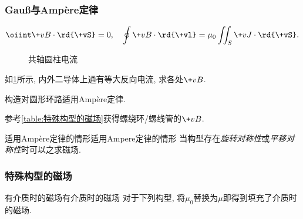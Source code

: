 \documentclass[hidelinks]{ctexart}
\begin{document}

\subsubsection{\texorpdfstring{Gau\ss 与Amp\`ere定律}{Gauss定律与Ampere定律}} %
\label{ssub:gauss与amp1ere定律}

\begin{finale}
    \begin{equation*}
        \oiint \+vB\cdot\rd{\+vS} = 0,\quad \oint \+vB\cdot\rd{\+vl} = \mu_0 \iint_S \+vJ\cdot\rd{\+vS}.
    \end{equation*}
\end{finale}

\begin{figure}[ht]
    \centering
    \caption{共轴圆柱电流}
    \label{fig:共轴圆柱电流}
\end{figure}

\begin{sample}
    \begin{ex}
        如\cref{fig:共轴圆柱电流}所示, 内外二导体上通有等大反向电流, 求各处$\+vB$.
    \end{ex}
    \begin{solution}
        构造对圆形环路适用Amp\`ere定律.
    \end{solution}
\end{sample}
\begin{hardlink}
    参考\cref{table:特殊构型的磁场}获得螺绕环/螺线管的$\+vB$.
\end{hardlink}

\begin{reflex}
    {适用Amp\`ere定律的情形}{适用Ampere定律的情形}
    当构型存在\emph{旋转对称性}或\emph{平移对称性}时可以之求磁场.
\end{reflex}


\subsubsection{特殊构型的磁场} %
\label{ssub:特殊构型的磁场}

\begin{reflex}
    {有介质时的磁场}{有介质时的磁场}
    对于下列构型, 将$\mu_0$替换为$\mu$即得到填充了介质时的磁场.
\end{reflex}
\end{document}

